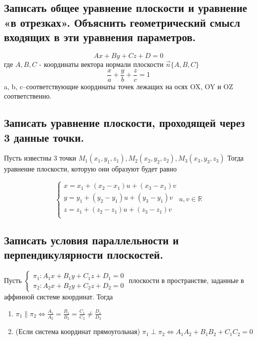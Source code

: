 \subsection{Записать общее уравнение плоскости и уравнение «в отрезках». Объяснить 
геометрический смысл входящих в эти уравнения параметров.}

$$Ax + By + Cz + D = 0$$где $A, B, C$ - координаты вектора нормали плоскости $\vec{n}\{A, B, C\}$
$$\frac{x}{a}+\frac{y}{b}+\frac{z}{c} = 1$$a, b, c–соответствующие координаты точек 
лежащих на осях OX, OY и OZ соответственно.



\subsection{Записать уравнение плоскости, проходящей через 3 данные точки.}
Пусть известны 3 точки $M_1(x_1,y_1,z_1),M_2(x_2,y_2,z_2),M_3(x_3,y_3,z_3)$
Тогда уравнение плоскости, которую они образуют будет равно 


$$
 \begin{cases}
   x = x_1+(x_2-x_1)u+(x_3-x_1)v\\
   y = y_1+(y_2-y_1)u+(y_3-y_1)v\\
   z = z_1+(z_2-z_1)u+(z_3-z_1)v\\
 \end{cases}
 u,v \in \mathbb{R}
$$

\subsection{Записать условия параллельности и перпендикулярности плоскостей.}

Пусть $\begin{cases}\pi_1: A_1x+B_1y+C_1z+D_1 = 0\\\pi_2: A_2x+B_2y+C_2z+D_2 = 0\end{cases}$
плоскости в пространстве, заданные в аффинной системе координат. Тогда 
\begin{enumerate}
    \item $\pi_1 \parallel \pi_2 \iff \frac{A_1}{A_2} = \frac{B_1}{B_2} = \frac{C_1}{C_2} \ne \frac{D_1}{D_2}$
    \item (Если система координат прямоугольная) $\pi_1 \perp \pi_2 \iff A_1A_2 + B_1B_2 + C_1C_2 = 0$
\end{enumerate} 


